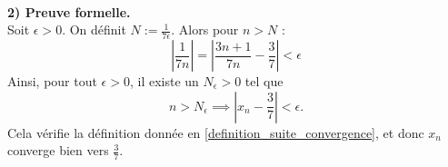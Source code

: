 \documentclass[oneside,11pt,french,table]{book}
\theoremstyle{definition}
\theoremstyle{plain}
\theoremstyle{remark}
\begin{document}
  \paragraph{}
  \textbf{2) Preuve formelle.}\\
  Soit $\epsilon>0$. On définit $N := \displaystyle\frac{1}{7 \epsilon}$. Alors pour $n>N$ : $$ \left| \dfrac{1}{7n} \right| = \left| \displaystyle\frac{3n + 1}{7n} - \displaystyle\frac{3}{7} \right| < \epsilon$$
Ainsi, pour tout $\epsilon > 0$, il existe un $N_\epsilon > 0$ tel que $$n > N_\epsilon \implies \left| x_n - \dfrac{3}{7} \right| < \epsilon.$$ 
Cela vérifie la définition donnée en \ref{definition_suite_convergence}, et donc $x_n$ converge bien vers $\frac{3}{7}$.
\end{document}
